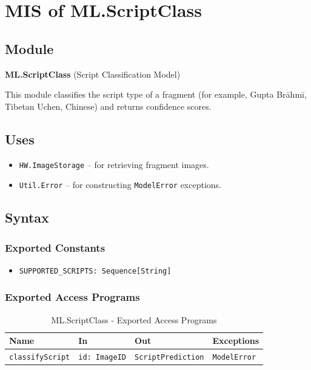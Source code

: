 \documentclass[12pt, titlepage]{article}
\begin{document}
\section{MIS of ML.ScriptClass} \label{ML.ScriptClass}

\subsection{Module}
\textbf{ML.ScriptClass} \; (Script Classification Model)

This module classifies the script type of a fragment (for example, Gupta Brāhmī, Tibetan Uchen, Chinese) and returns confidence scores.

\subsection{Uses}
\begin{itemize}
    \item \texttt{HW.ImageStorage} – for retrieving fragment images.
    \item \texttt{Util.Error} – for constructing \texttt{ModelError} exceptions.
\end{itemize}

\subsection{Syntax}

\subsubsection{Exported Constants}
\begin{itemize}
    \item \texttt{SUPPORTED\_SCRIPTS: Sequence[String]}
\end{itemize}

\subsubsection{Exported Access Programs}

\begin{table}[H]
\centering
\small
\caption{ML.ScriptClass - Exported Access Programs}
\begin{tabular}{p{3.5cm} p{3.5cm} p{3.5cm} p{3.5cm}}
\toprule
\textbf{Name} & \textbf{In} & \textbf{Out} & \textbf{Exceptions} \\
\midrule
\texttt{classifyScript} & \texttt{id: ImageID} & \texttt{ScriptPrediction} & \texttt{ModelError} \\
\bottomrule
\end{tabular}
\end{table}
\end{document}
